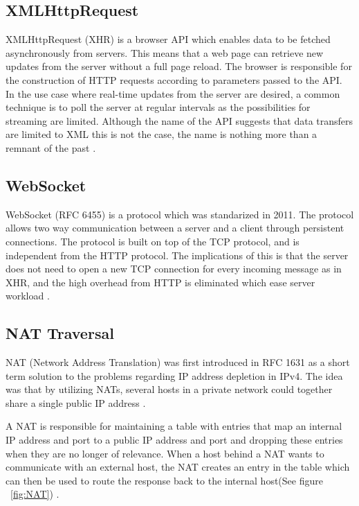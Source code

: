 \subsection{XMLHttpRequest}
XMLHttpRequest (XHR) is a browser API which enables data to be fetched asynchronously from servers. This means that a web page can retrieve new updates from the server without a full page reload. The browser is responsible for the construction of HTTP requests according to parameters passed to the API. In the use case where real-time updates from the server are desired, a common technique is to poll the server at regular intervals as the possibilities for streaming are limited. Although the name of the API suggests that data transfers are limited to XML this is not the case, the name is nothing more than a remnant of the past \cite{XHR:Online}.

\subsection{WebSocket}
WebSocket (RFC 6455) is a protocol which was standarized in 2011. The protocol allows two way communication between a server and a client through persistent connections. The protocol is built on top of the TCP protocol, and is independent from the HTTP protocol. The implications of this is that the server does not need to open a new TCP connection for every incoming message as in XHR, and the high overhead from HTTP is eliminated which ease server workload \cite{RFC6455:Online}.

\subsection{NAT Traversal}
NAT (Network Address Translation) was first introduced in RFC 1631 as a short term solution to the problems regarding IP address depletion in IPv4. The idea was that by utilizing NATs, several hosts in a private network could together share a single public IP address \cite{RFC1631:Online}.

A NAT is responsible for maintaining a table with entries that map an internal IP address and port to a public IP address and port and dropping these entries when they are no longer of relevance. When a host behind a NAT wants to communicate with an external host, the NAT creates an entry in the table which can then be used to route the response back to the internal host(See figure ~\ref{fig:NAT}) \cite{RFC5245:Online}.

